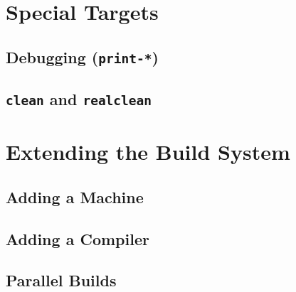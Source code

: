 \section{Special Targets}

\subsection{Debugging ({\tt print-*})}

\subsection{{\tt clean} and {\tt realclean}}



\section{Extending the Build System}

\subsection{Adding a Machine}

\subsection{Adding a Compiler}

\subsection{Parallel Builds}





